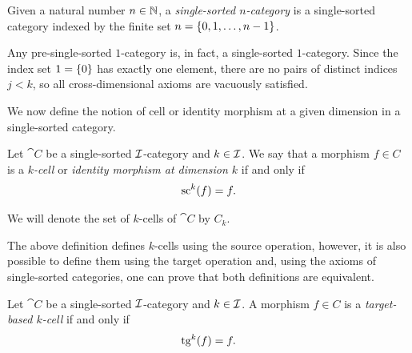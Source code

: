 \begin{definition}
  \label{def:SingleSortedNCategory}
  \leanok
  Given a natural number $n \in \mathbb{N}$, a \emph{single-sorted $n$-category} is a single-sorted
  category indexed by the finite set $n = \left\{ 0, 1, \ldots, n-1 \right\}$.
\end{definition}

\begin{definition}
  \label{def:PreSingleSortedCategoryLift}
  \leanok
  Any pre-single-sorted $1$-category is, in fact, a single-sorted $1$-category. Since the index
  set $1 = \left\{ 0 \right\}$ has exactly one element, there are no pairs of distinct indices $j < k$, so all
  cross-dimensional axioms are vacuously satisfied.
\end{definition}

We now define the notion of cell or identity morphism at a given dimension in a single-sorted
category.

\begin{definition}[Cell]
  \label{def:cell}
  \leanok
  Let $\cat{C}$ be a single-sorted $\mathcal{I}$-category and $k \in \mathcal{I}$. We say that a morphism $f
  \in C$ is a \emph{$k$-cell} or \emph{identity morphism at dimension $k$} if and only if
  \[
    \operatorname{sc}^k (f) = f.
  \]

  We will denote the set of $k$-cells of $\cat{C}$ by $C_k$.
\end{definition}

The above definition defines $k$-cells using the source operation, however, it is also possible to
define them using the target operation and, using the axioms of single-sorted categories, one can
prove that both definitions are equivalent.

\begin{definition}
  \label{def:cell_tg}
  \leanok
  Let $\cat{C}$ be a single-sorted $\mathcal{I}$-category and $k \in \mathcal{I}$. A morphism $f \in C$ is a
  \emph{target-based $k$-cell} if and only if
  \[
    \operatorname{tg}^k (f) = f.
  \]
\end{definition}

